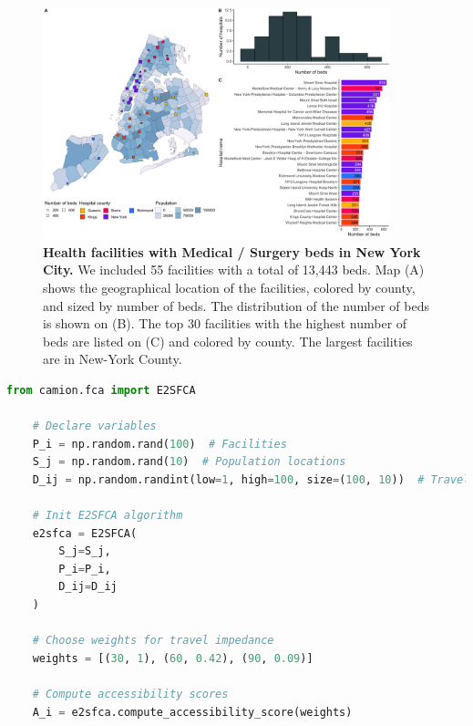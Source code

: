 \begin{figure}[H]
    \includegraphics[width=0.9\textwidth]{images/camion-ny/fig1.png}
    \centering
    \caption{ \textbf{Health facilities with Medical / Surgery beds in New York
            City.} We included 55 facilities with a total of 13,443 beds. Map (A)
        shows the geographical location of the facilities, colored by county,
        and sized by number of beds. The distribution of the number of beds is
        shown on (B). The top 30 facilities with the highest number of beds are
        listed on (C) and colored by county. The largest facilities are in
        New-York County. }
    \label{fig:camion-ny-beds}
\end{figure}

\begin{minipage}{\textwidth}
    \begin{lstlisting}[language=Python, caption=Compute accessibility score with \ac{e2sfca}]
    from camion.fca import E2SFCA

    # Declare variables
    P_i = np.random.rand(100)  # Facilities
    S_j = np.random.rand(10)  # Population locations
    D_ij = np.random.randint(low=1, high=100, size=(100, 10))  # Travel impedance

    # Init E2SFCA algorithm
    e2sfca = E2SFCA(
        S_j=S_j,
        P_i=P_i,
        D_ij=D_ij
    )

    # Choose weights for travel impedance
    weights = [(30, 1), (60, 0.42), (90, 0.09)]

    # Compute accessibility scores
    A_i = e2sfca.compute_accessibility_score(weights)
    \end{lstlisting}
\end{minipage}

